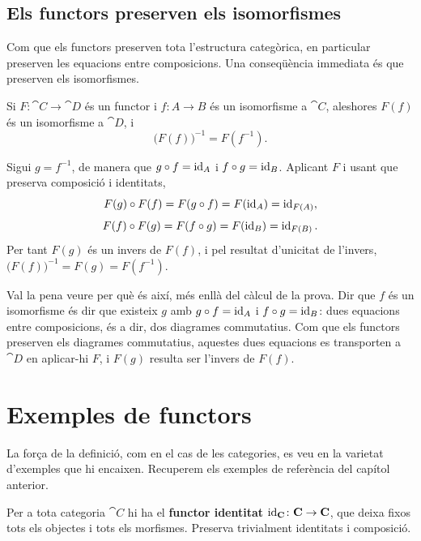 \subsection{Els functors preserven els isomorfismes}\label{sec:preserven-isos}

Com que els functors preserven tota l'estructura categòrica, en particular preserven les equacions entre composicions. Una conseqüència immediata és que preserven els isomorfismes.

\begin{proposicio}\label{prop:functor-preserva-iso}
Si $F\colon\cat{C}\to\cat{D}$ és un functor i $f\colon A\to B$ és un isomorfisme a $\cat{C}$, aleshores $F(f)$ és un isomorfisme a $\cat{D}$, i
\[
\bigl(F(f)\bigr)^{-1}=F(f^{-1}).
\]
\end{proposicio}

\begin{prova}
Sigui $g=f^{-1}$, de manera que $g\circ f=\operatorname{id}_A$ i $f\circ g=\operatorname{id}_B$. Aplicant $F$ i usant que preserva composició i identitats,
\[
F(g)\circ F(f)=F(g\circ f)=F(\operatorname{id}_A)=\operatorname{id}_{F(A)},
\]
\[
F(f)\circ F(g)=F(f\circ g)=F(\operatorname{id}_B)=\operatorname{id}_{F(B)}.
\]
Per tant $F(g)$ és un invers de $F(f)$, i pel resultat d'unicitat de l'invers, $\bigl(F(f)\bigr)^{-1}=F(g)=F(f^{-1})$.
\end{prova}

\begin{observacio}
Val la pena veure per què és així, més enllà del càlcul de la prova. Dir que $f$ és un isomorfisme és dir que existeix $g$ amb $g\circ f=\operatorname{id}_A$ i $f\circ g=\operatorname{id}_B$: dues equacions entre composicions, és a dir, dos diagrames commutatius. Com que els functors preserven els diagrames commutatius, aquestes dues equacions es transporten a $\cat{D}$ en aplicar-hi $F$, i $F(g)$ resulta ser l'invers de $F(f)$.
\end{observacio}

\section{Exemples de functors}\label{sec:primers-exemples}

La força de la definició, com en el cas de les categories, es veu en la varietat d'exemples que hi encaixen. Recuperem els exemples de referència del capítol anterior.

\begin{exemple}
Per a tota categoria $\cat{C}$ hi ha el \textbf{functor identitat} $\operatorname{id}_{\mathbf{C}}\colon\mathbf{C}\to\mathbf{C}$, que deixa fixos tots els objectes i tots els morfismes. Preserva trivialment identitats i composició.
\end{exemple}

